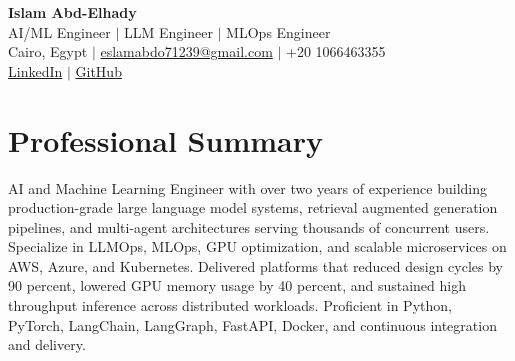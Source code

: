 \documentclass[10pt,letterpaper]{article}
\begin{document}
\begin{center}
{\LARGE \textbf{Islam Abd-Elhady}}\\[4pt]
AI/ML Engineer $|$ LLM Engineer $|$ MLOps Engineer\\[2pt]
Cairo, Egypt $|$ \href{mailto:eslamabdo71239@gmail.com}{eslamabdo71239@gmail.com} $|$ +20 1066463355\\
\href{https://linkedin.com/in/islam-abd-elhady-323523211}{LinkedIn} $|$ \href{https://github.com/Islam-hady9}{GitHub}
\end{center}

\section{Professional Summary}
AI and Machine Learning Engineer with over two years of experience building production-grade large language model systems, retrieval augmented generation pipelines, and multi-agent architectures serving thousands of concurrent users. Specialize in LLMOps, MLOps, GPU optimization, and scalable microservices on AWS, Azure, and Kubernetes. Delivered platforms that reduced design cycles by 90 percent, lowered GPU memory usage by 40 percent, and sustained high throughput inference across distributed workloads. Proficient in Python, PyTorch, LangChain, LangGraph, FastAPI, Docker, and continuous integration and delivery.
\end{document}
